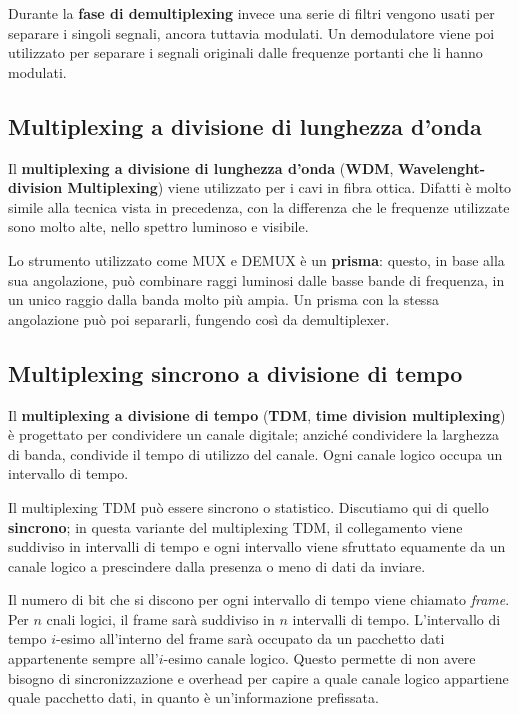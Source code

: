         Durante la \textbf{fase di demultiplexing} invece una serie di filtri vengono usati per separare i singoli segnali, ancora tuttavia modulati. Un demodulatore viene poi utilizzato per separare i segnali originali dalle frequenze portanti che li hanno modulati.
        
    \subsection{Multiplexing a divisione di lunghezza d'onda}
        Il \textbf{multiplexing a divisione di lunghezza d'onda} (\textbf{WDM}, \textbf{Wavelenght-division Multiplexing}) viene utilizzato per i cavi in fibra ottica. Difatti è molto simile alla tecnica vista in precedenza, con la differenza che le frequenze utilizzate sono molto alte, nello spettro luminoso e visibile.
        
        Lo strumento utilizzato come MUX e DEMUX è un \textbf{prisma}: questo, in base alla sua angolazione, può combinare raggi luminosi dalle basse bande di frequenza, in un unico raggio dalla banda molto più ampia. Un prisma con la stessa angolazione può poi separarli, fungendo così da demultiplexer.
        
    \subsection{Multiplexing sincrono a divisione di tempo}
        Il \textbf{multiplexing a divisione di tempo} (\textbf{TDM}, \textbf{time division multiplexing}) è progettato per condividere un canale digitale; anziché condividere la larghezza di banda, condivide il tempo di utilizzo del canale. Ogni canale logico occupa un intervallo di tempo.
        
        Il multiplexing TDM può essere sincrono o statistico. Discutiamo qui di quello \textbf{sincrono}; in questa variante del multiplexing TDM, il collegamento viene suddiviso in intervalli di tempo e ogni intervallo viene sfruttato equamente da un canale logico a prescindere dalla presenza o meno di dati da inviare.
        
        Il numero di bit che si discono per ogni intervallo di tempo viene chiamato \textit{frame}. Per $n$ cnali logici, il frame sarà suddiviso in $n$ intervalli di tempo. L'intervallo di tempo $i$-esimo all'interno del frame sarà occupato da un pacchetto dati appartenente sempre all'$i$-esimo canale logico. Questo permette di non avere bisogno di sincronizzazione e overhead per capire a quale canale logico appartiene quale pacchetto dati, in quanto è un'informazione prefissata.
        
